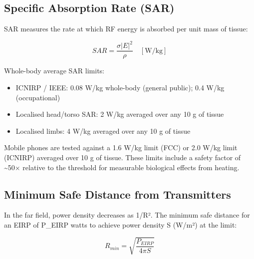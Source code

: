       

\subsection{Specific Absorption Rate (SAR)}

      

SAR measures the rate at which RF energy is absorbed per unit mass of tissue:

      
\[SAR = \dfrac{\sigma |E|^2}{\rho}\quad [\text{W/kg}]\]

      

Whole-body average SAR limits:

      
\begin{itemize}

        \item ICNIRP / IEEE: 0.08 W/kg whole-body (general public); 0.4 W/kg (occupational)

        \item Localised head/torso SAR: 2 W/kg averaged over any 10 g of tissue

        \item Localised limbs: 4 W/kg averaged over any 10 g of tissue

      
\end{itemize}

      

Mobile phones are tested against a 1.6 W/kg limit (FCC) or 2.0 W/kg limit (ICNIRP) averaged over 10 g of tissue. These limits include a safety factor of \textasciitilde{}50× relative to the threshold for measurable biological effects from heating.

      

\subsection{Minimum Safe Distance from Transmitters}

      

In the far field, power density decreases as 1/R². The minimum safe distance for an EIRP of P\_EIRP watts to achieve power density S (W/m²) at the limit:


      
\[R_{min} = \sqrt{\dfrac{P_{EIRP}}{4\pi S}}\]

      

